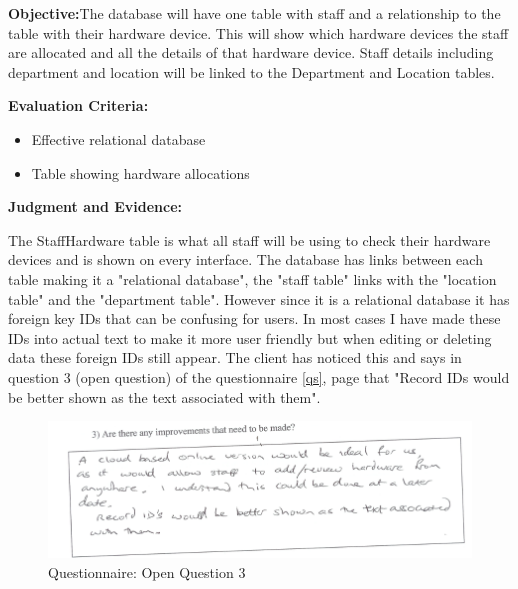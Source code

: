 \textbf{Objective:}The database will have one table with staff and a relationship to the table with their hardware device. This will show which hardware devices the staff are allocated and all the details of that hardware device. Staff details including department and location will be linked to the Department and Location tables.

\textbf{Evaluation Criteria:}
\begin{itemize}
\item{Effective relational database}
\item{Table showing hardware allocations}
\end{itemize}

\textbf{Judgment and Evidence:}

The StaffHardware table is what all staff will be using to check their hardware devices and is shown on every interface. The database has links between each table making it a "relational database", the "staff table" links with the "location table" and the "department table". However since it is a relational database it has foreign key IDs that can be confusing for users. In most cases I have made these IDs into actual text to make it more user friendly but when editing or deleting data these foreign IDs still appear. The client has noticed this and says in question 3  (open question) of the questionnaire \ref{qs}, page \pageref{qs} that "Record IDs would be better shown as the text associated with them".

\begin{figure}[H]
    \includegraphics[width=\textwidth]{./Evaluation/EvaluationQuestionnaire/o3.png}
    \caption{Questionnaire: Open Question 3} 
\end{figure}

